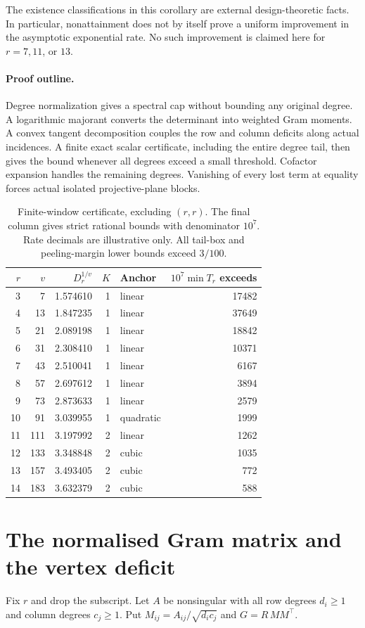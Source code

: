 \documentclass[11pt]{article}
\theoremstyle{remark}
\begin{document}
The existence classifications in this corollary are external design-theoretic
facts. In particular, nonattainment does not by itself prove a uniform
improvement in the asymptotic exponential rate. No such improvement is claimed
here for $r=7,11$, or $13$.

\paragraph{Proof outline.}
Degree normalization gives a spectral cap without bounding any original degree.
A logarithmic majorant converts the determinant into weighted Gram moments.
A convex tangent decomposition couples the row and column deficits along actual
incidences. A finite exact scalar certificate, including the entire degree tail,
then gives the bound whenever all degrees exceed a small threshold. Cofactor
expansion handles the remaining degrees. Vanishing of every lost term at
equality forces actual isolated projective-plane blocks.

\begin{table}[t]\centering\small
\begin{tabular}{rrrrlr}\toprule
$r$ & $v$ & $D_r^{1/v}$ & $K$ & Anchor & $10^7\min T_r$ exceeds\\\midrule
3&7&1.574610&1&linear&17482\\
4&13&1.847235&1&linear&37649\\
5&21&2.089198&1&linear&18842\\
6&31&2.308410&1&linear&10371\\
7&43&2.510041&1&linear&6167\\
8&57&2.697612&1&linear&3894\\
9&73&2.873633&1&linear&2579\\
10&91&3.039955&1&quadratic&1999\\
11&111&3.197992&2&linear&1262\\
12&133&3.348848&2&cubic&1035\\
13&157&3.493405&2&cubic&772\\
14&183&3.632379&2&cubic&588\\\bottomrule
\end{tabular}
\caption{Finite-window certificate, excluding $(r,r)$. The final column gives
strict rational bounds with denominator $10^7$. Rate decimals are illustrative
only. All tail-box and peeling-margin lower bounds exceed $3/100$.}
\label{tab:cert}
\end{table}

\section{The normalised Gram matrix and the vertex deficit}
Fix $r$ and drop the subscript. Let $A$ be nonsingular with all row degrees $d_i\ge1$ and column degrees $c_j\ge1$.
Put $M_{ij}=A_{ij}/\sqrt{d_ic_j}$ and $G=R\,MM^{\top}$.
\end{document}
